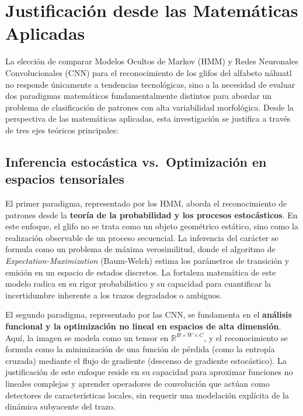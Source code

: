 \documentclass[
  spanish,
  us-letterpaper,
  DIV=11,
  numbers=noendperiod]{scrreprt}
\begin{document}
\section{Justificación desde las Matemáticas
Aplicadas}\label{justificaciuxf3n-desde-las-matemuxe1ticas-aplicadas}

La elección de comparar Modelos Ocultos de Markov (HMM) y Redes
Neuronales Convolucionales (CNN) para el reconocimiento de los glifos
del alfabeto náhuatl no responde únicamente a tendencias tecnológicas,
sino a la necesidad de evaluar dos paradigmas matemáticos
fundamentalmente distintos para abordar un problema de clasificación de
patrones con alta variabilidad morfológica. Desde la perspectiva de las
matemáticas aplicadas, esta investigación se justifica a través de tres
ejes teóricos principales:

\subsection{Inferencia estocástica vs.~Optimización en espacios
tensoriales}\label{inferencia-estocuxe1stica-vs.-optimizaciuxf3n-en-espacios-tensoriales}

El primer paradigma, representado por los HMM, aborda el reconocimiento
de patrones desde la \textbf{teoría de la probabilidad y los procesos
estocásticos}. En este enfoque, el glifo no se trata como un objeto
geométrico estático, sino como la realización observable de un proceso
secuencial. La inferencia del carácter se formula como un problema de
máxima verosimilitud, donde el algoritmo de
\emph{Expectation-Maximization} (Baum-Welch) estima los parámetros de
transición y emisión en un espacio de estados discretos. La fortaleza
matemática de este modelo radica en su rigor probabilístico y su
capacidad para cuantificar la incertidumbre inherente a los trazos
degradados o ambiguos.

El segundo paradigma, representado por las CNN, se fundamenta en el
\textbf{análisis funcional y la optimización no lineal en espacios de
alta dimensión}. Aquí, la imagen se modela como un tensor en
\(\mathbb{R}^{H \times W \times C}\), y el reconocimiento se formula
como la minimización de una función de pérdida (como la entropía
cruzada) mediante el flujo de gradiente (descenso de gradiente
estocástico). La justificación de este enfoque reside en su capacidad
para aproximar funciones no lineales complejas y aprender operadores de
convolución que actúan como detectores de características locales, sin
requerir una modelación explícita de la dinámica subyacente del trazo.
\end{document}
